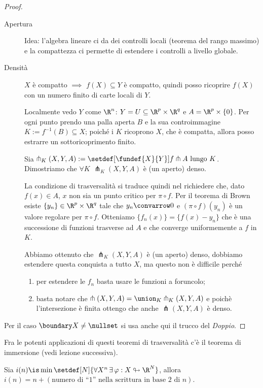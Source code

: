 \begin{proof}~
\begin{description}
\item [Apertura]
Idea: l'algebra lineare ci da dei controlli locali (teorema del rango massimo) e la compattezza ci permette di estendere i controlli a livello globale.
\item [Densità]
$X$ è compatto $\implies$ $f(X) \subseteq Y$ è compatto, quindi posso ricoprire $f(X)$ con un numero finito di carte locali di $Y$.

Localmente vedo $Y$ come $\R^n$: $Y = U \subseteq \R^p \times \R^q$ e $A = \R^p \times \{ 0 \}$. Per ogni punto prendo una palla aperta $B$ e la sua controimmagine $K := f^{-1}(B) \subseteq X$; poiché i $K$ ricoprono $X$, che è compatta, allora posso estrarre un sottoricoprimento finito.

Sia $\pitchfork_K(X,Y,A) := \setdef[\fundef{X}{Y}]{f \pitchfork A \text{ lungo } K}$. Dimostriamo che $\forall K$ $\pitchfork_K(X,Y,A)$ è (un aperto) denso. 
\begin{center}
  
\end{center}
La condizione di trasversalità si traduce quindi nel richiedere che, dato $f(x) \in A$, $x$ non sia un punto critico per $\pi \circ f$. Per il teorema di Brown esiste $\{ y_n \} \in \R^p \times \R^q$ tale che $y_n \convarrow 0$ e $(\pi \circ f)(y_n)$ è un valore regolare per $\pi \circ f$. Otteniamo $\{ f_n(x) \} = \{ f(x) - y_n \}$ che è una successione di funzioni trasverse ad $A$ e che converge uniformemente a $f$  in $K$.

Abbiamo ottenuto che $\pitchfork_K(X,Y,A)$ è (un aperto) denso, dobbiamo estendere questa conquista a tutto $X$, ma questo non è difficile perché 
\begin{enumerate}
\item per estendere le $f_n$ basta  usare le funzioni a foruncolo;
\item basta notare che $\pitchfork(X,Y,A) = \union_K \pitchfork_K(X,Y,A)$ e poichè l'intersezione è finita ottengo che anche $\pitchfork(X,Y,A)$ è denso.
\end{enumerate}
\end{description}

Per il caso $\boundary X \neq \nullset$ si usa anche qui il trucco del \emph{Doppio}.
\end{proof}

Fra le potenti applicazioni di questi teoremi di trasversalità c'è il teorema di immersione (vedi lezione successiva).

\begin{teo}
Sia $i(n) \is\min\setdef[N]{\forall X^n\,\exists\,\varphi: X \looparrowright \R^N}$, allora $i(n) = n + (\text{numero di ``1'' nella scrittura in base 2 di $n$})$. \footnotemark
\end{teo}

